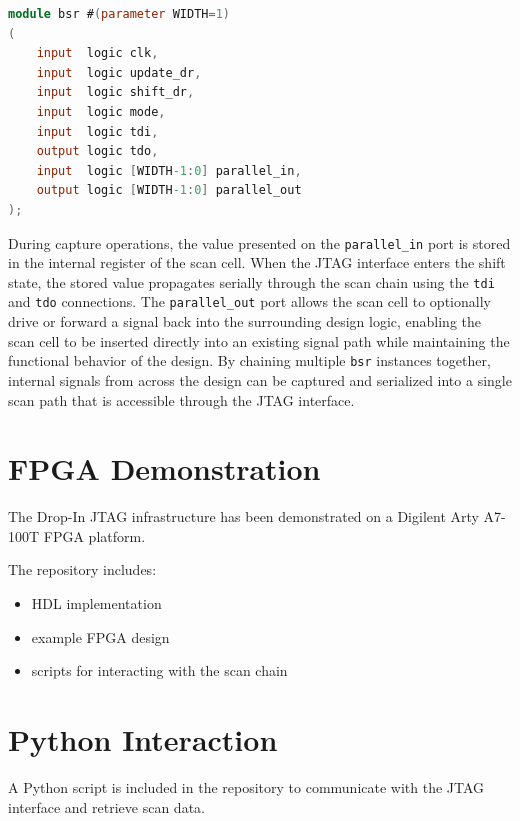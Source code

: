 \documentclass[10pt]{article}
\begin{document}
\begin{lstlisting}[language=Verilog, basicstyle=\ttfamily\footnotesize, caption={Excerpt from the Drop-In JTAG boundary-scan register implementation in \texttt{bsr.sv}.}, label={lst:bsr}]
module bsr #(parameter WIDTH=1)
(
    input  logic clk,
    input  logic update_dr,
    input  logic shift_dr,
    input  logic mode,
    input  logic tdi,
    output logic tdo,
    input  logic [WIDTH-1:0] parallel_in,
    output logic [WIDTH-1:0] parallel_out
);
\end{lstlisting}

During capture operations, the value presented on the \texttt{parallel\_in} port is stored in the internal register of the scan cell. When the JTAG interface enters the shift state, the stored value propagates serially through the scan chain using the \texttt{tdi} and \texttt{tdo} connections. The \texttt{parallel\_out} port allows the scan cell to optionally drive or forward a signal back into the surrounding design logic, enabling the scan cell to be inserted directly into an existing signal path while maintaining the functional behavior of the design. By chaining multiple \texttt{bsr} instances together, internal signals from across the design can be captured and serialized into a single scan path that is accessible through the JTAG interface.



\section{FPGA Demonstration}

The Drop-In JTAG infrastructure has been demonstrated on a Digilent Arty A7-100T FPGA platform.

The repository includes:

\begin{itemize}
\item HDL implementation
\item example FPGA design
\item scripts for interacting with the scan chain
\end{itemize}

\section{Python Interaction}

A Python script is included in the repository to communicate with the JTAG interface and retrieve scan data.
\end{document}
